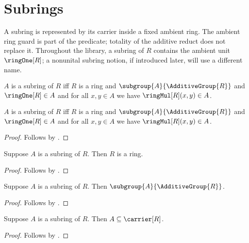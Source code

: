 



\section{Subrings}

A subring is represented by its carrier inside a fixed ambient ring.  The
ambient ring guard is part of the predicate; totality of the additive reduct
does not replace it.  Throughout the library, a subring of $R$ contains the
ambient unit $\ringOne[R]$; a nonunital subring notion, if introduced later,
will use a different name.

\begin{definition}\label{subring}
    $A$ is a subring of $R$ iff
        $R$ is a ring and
        $\subgroup{A}{\AdditiveGroup{R}}$ and
        $\ringOne[R]\in A$ and
        for all $x,y\in A$ we have $\ringMul[R](x,y)\in A$.
\end{definition}

\begin{proposition}\label{subring_iff}
    $A$ is a subring of $R$ iff
        $R$ is a ring and
        $\subgroup{A}{\AdditiveGroup{R}}$ and
        $\ringOne[R]\in A$ and
        for all $x,y\in A$ we have $\ringMul[R](x,y)\in A$.
\end{proposition}
\begin{proof}
    Follows by .
\end{proof}

\begin{proposition}\label{subring_ambient_ring}
    Suppose $A$ is a subring of $R$.
    Then $R$ is a ring.
\end{proposition}
\begin{proof}
    Follows by .
\end{proof}

\begin{proposition}\label{subring_additive_subgroup}
    Suppose $A$ is a subring of $R$.
    Then $\subgroup{A}{\AdditiveGroup{R}}$.
\end{proposition}
\begin{proof}
    Follows by .
\end{proof}

\begin{corollary}\label{subring_subseteq_carrier}
    Suppose $A$ is a subring of $R$.
    Then $A\subseteq\carrier[R]$.
\end{corollary}
\begin{proof}
    Follows by
        .
\end{proof}

